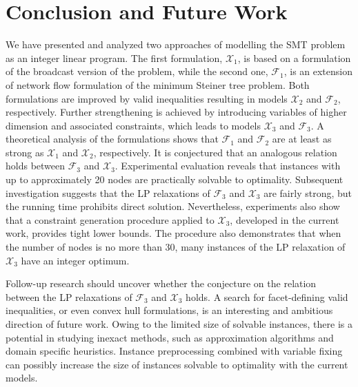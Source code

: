\section{Conclusion and Future Work}
\label{sec:conclusion}
We have presented and analyzed two approaches of modelling the SMT problem as an integer linear program.
The first formulation, $\mathcal{X}_1$, is based on a formulation of the broadcast version of the problem, while the second one, $\mathcal{F}_1$, is an extension of network flow formulation of the minimum Steiner tree problem.
Both formulations are improved by valid inequalities resulting in models $\mathcal{X}_2$ and $\mathcal{F}_2$, respectively. 
Further strengthening is achieved by introducing variables of higher dimension and associated constraints, which leads to models $\mathcal{X}_3$ and $\mathcal{F}_3$.
A theoretical analysis of the formulations shows that  $\mathcal{F}_1$ and $\mathcal{F}_2$ are at least as strong as $\mathcal{X}_1$ and $\mathcal{X}_2$, respectively. 
It is conjectured that an analogous relation holds between $\mathcal{F}_3$ and $\mathcal{X}_3$.
Experimental evaluation reveals that instances with up to approximately 20 nodes are practically solvable to optimality.
Subsequent investigation suggests that the LP relaxations of $\mathcal{F}_3$ and $\mathcal{X}_3$ are fairly strong, but the running time prohibits direct solution.
Nevertheless, experiments also show that a constraint generation procedure applied to $\mathcal{X}_3$, developed in the current work, provides tight lower bounds.
The procedure also demonstrates that when the number of nodes is no more than 30, many instances of the LP relaxation of $\mathcal{X}_3$ have an integer optimum.

Follow-up research should uncover whether the conjecture on the relation between the LP relaxations of $\mathcal{F}_3$ and $\mathcal{X}_3$ holds.
A search for facet-defining valid inequalities, or even convex hull formulations, is an interesting and ambitious direction of future work.
Owing to the limited size of solvable instances, there is a potential in studying inexact methods, such as approximation algorithms and domain specific heuristics.
Instance preprocessing combined with variable fixing can possibly increase the size of instances solvable to optimality with the current models.

